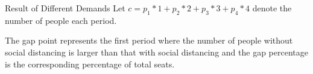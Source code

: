     \begin{frame}{Result of Different Demands}
        \small
        Let $c = p_1 * 1 + p_2 * 2 + p_3 * 3 + p_4 * 4$ denote the number of people each period.
        \begin{figure}[h]
            \centering
          \end{figure}

        The gap point represents the first period where the number of people without social distancing is larger than that with social distancing and the gap percentage is the corresponding percentage of total seats.
    \end{frame}
      
